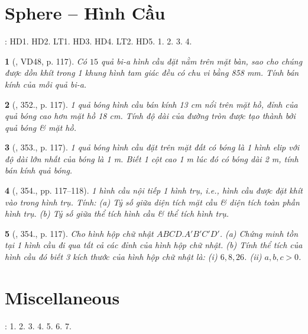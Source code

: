 \documentclass{article}
\newtheorem{baitoan}{}
\begin{document}

\section{Sphere -- Hình Cầu}
\cite[Chap. X, \S3, pp. 104--108]{SGK_Toan_9_Canh_Dieu_tap_1}: HD1. HD2. LT1. HD3. HD4. LT2. HD5. 1. 2. 3. 4.

\begin{baitoan}[\cite{Binh_Toan_9_tap_2}, VD48, p. 117]
	Có $15$ quả bi-a hình cầu đặt nằm trên mặt bàn, sao cho chúng được dồn khít trong 1 khung hình tam giác đều có chu vi bằng {\rm858 mm}. Tính bán kính của mỗi quả bi-a.
\end{baitoan}

\begin{baitoan}[\cite{Binh_Toan_9_tap_2}, 352., p. 117]
	1 quả bóng hình cầu bán kính {\rm13 cm} nổi trên mặt hồ, đỉnh của quả bóng cao hơn mặt hồ {\rm18 cm}. Tính độ dài của đường tròn được tạo thành bởi quả bóng \& mặt hồ.
\end{baitoan}

\begin{baitoan}[\cite{Binh_Toan_9_tap_2}, 353., p. 117]
	1 quả bóng hình cầu đặt trên mặt đất có bóng là 1 hình elip với độ dài lớn nhất của bóng là {\rm1 m}. Biết 1 cột cao {\rm1 m} lúc đó có bóng dài {\rm2 m}, tính bán kính quả bóng.
\end{baitoan}

\begin{baitoan}[\cite{Binh_Toan_9_tap_2}, 354., pp. 117--118]
	1 hình cầu nội tiếp 1 hình trụ, i.e., hình cầu được đặt khít vào trong hình trụ. Tính: (a) Tỷ số giữa diện tích mặt cầu \& diện tích toàn phần hình trụ. (b) Tỷ số giữa thể tích hình cầu \& thể tích hình trụ.
\end{baitoan}

\begin{baitoan}[\cite{Binh_Toan_9_tap_2}, 354., p. 117]
	Cho hình hộp chữ nhật $ABCD.A'B'C'D'$. (a) Chứng minh tồn tại 1 hình cầu đi qua tất cả các đỉnh của hình hộp chữ nhật. (b) Tính thể tích của hình cầu đó biết 3 kích thước của hình hộp chữ nhật là: (i) $6,8,26$. (ii) $a,b,c > 0$.
\end{baitoan}


\section{Miscellaneous}
\cite[BTCCX, pp. 109--110]{SGK_Toan_9_Canh_Dieu_tap_1}: 1. 2. 3. 4. 5. 6. 7.
\end{document}
